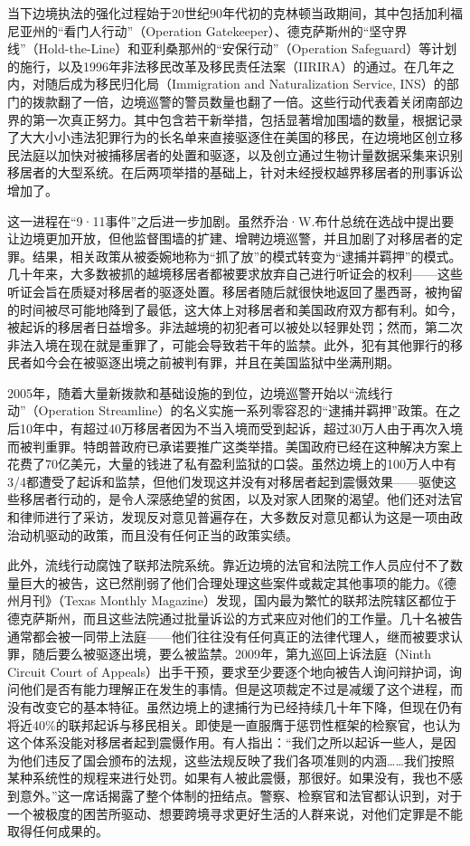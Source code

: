 \documentclass[fontset=fandol, a4paper, 12pt, openright]{ctexbook}
\begin{document}
当下边境执法的强化过程始于20世纪90年代初的克林顿当政期间，其中包括加利福尼亚州的“看门人行动”（Operation Gatekeeper）、德克萨斯州的“坚守界线”（Hold-the-Line）和亚利桑那州的“安保行动”（Operation Safeguard）等计划的施行，以及1996年非法移民改革及移民责任法案（IIRIRA）的通过。在几年之内，对随后成为移民归化局（Immigration and Naturalization Service, INS）的部门的拨款翻了一倍，边境巡警的警员数量也翻了一倍。这些行动代表着关闭南部边界的第一次真正努力。其中包含若干新举措，包括显著增加围墙的数量，根据记录了大大小小违法犯罪行为的长名单来直接驱逐住在美国的移民，在边境地区创立移民法庭以加快对被捕移居者的处置和驱逐，以及创立通过生物计量数据采集来识别移居者的大型系统。在后两项举措的基础上，针对未经授权越界移居者的刑事诉讼增加了。

这一进程在“9·11事件”之后进一步加剧。虽然乔治·W.布什总统在选战中提出要让边境更加开放，但他监督围墙的扩建、增聘边境巡警，并且加剧了对移居者的定罪。结果，相关政策从被委婉地称为“抓了放”的模式转变为“逮捕并羁押”的模式。几十年来，大多数被抓的越境移居者都被要求放弃自己进行听证会的权利——这些听证会旨在质疑对移居者的驱逐处置。移居者随后就很快地返回了墨西哥，被拘留的时间被尽可能地降到了最低，这大体上对移居者和美国政府双方都有利。如今，被起诉的移居者日益增多。非法越境的初犯者可以被处以轻罪处罚；然而，第二次非法入境在现在就是重罪了，可能会导致若干年的监禁。此外，犯有其他罪行的移民者如今会在被驱逐出境之前被判有罪，并且在美国监狱中坐满刑期。

2005年，随着大量新拨款和基础设施的到位，边境巡警开始以“流线行动”（Operation Streamline）的名义实施一系列零容忍的“逮捕并羁押”政策。在之后10年中，有超过40万移居者因为不当入境而受到起诉，超过30万人由于再次入境而被判重罪。特朗普政府已承诺要推广这类举措。美国政府已经在这种解决方案上花费了70亿美元，大量的钱进了私有盈利监狱的口袋。虽然边境上的100万人中有3/4都遭受了起诉和监禁，但他们发现这并没有对移居者起到震慑效果——驱使这些移居者行动的，是令人深感绝望的贫困，以及对家人团聚的渴望。他们还对法官和律师进行了采访，发现反对意见普遍存在，大多数反对意见都认为这是一项由政治动机驱动的政策，而且没有任何正当的政策实绩。

此外，流线行动腐蚀了联邦法院系统。靠近边境的法官和法院工作人员应付不了数量巨大的被告，这已然削弱了他们合理处理这些案件或裁定其他事项的能力。《德州月刊》（Texas Monthly Magazine）发现，国内最为繁忙的联邦法院辖区都位于德克萨斯州，而且这些法院通过批量诉讼的方式来应对他们的工作量。几十名被告通常都会被一同带上法庭——他们往往没有任何真正的法律代理人，继而被要求认罪，随后要么被驱逐出境，要么被监禁。2009年，第九巡回上诉法庭（Ninth Circuit Court of Appeals）出手干预，要求至少要逐个地向被告人询问辩护词，询问他们是否有能力理解正在发生的事情。但是这项裁定不过是减缓了这个进程，而没有改变它的基本特征。虽然边境上的逮捕行为已经持续几十年下降，但现在仍有将近40\%的联邦起诉与移民相关。即使是一直服膺于惩罚性框架的检察官，也认为这个体系没能对移居者起到震慑作用。有人指出：“我们之所以起诉一些人，是因为他们违反了国会颁布的法规，这些法规反映了我们各项准则的内涵……我们按照某种系统性的规程来进行处罚。如果有人被此震慑，那很好。如果没有，我也不感到意外。”这一席话揭露了整个体制的扭结点。警察、检察官和法官都认识到，对于一个被极度的困苦所驱动、想要跨境寻求更好生活的人群来说，对他们定罪是不能取得任何成果的。
\end{document}
